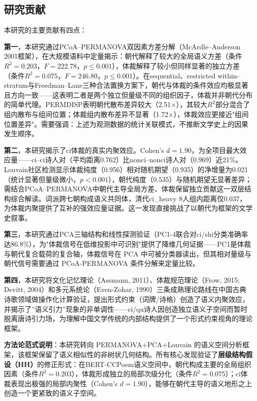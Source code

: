 \documentclass[12pt,a4paper]{article}
\numberwithin{equation}{section}
\begin{document}
\subsection{研究贡献}

本研究的主要贡献有四点：

\textbf{第一}，本研究通过PCoA--PERMANOVA双因素方差分解（McArdle--Anderson 2001框架），在大规模语料中定量揭示：朝代解释了较大的全局语义方差（条件$R^{2}=0.203$，$F=222.78$，$p\leq0.001$），体裁解释了较小但同样显著的独立方差（条件$R^{2}=0.075$，$F=246.80$，$p\leq0.001$）。在sequential、restricted within-stratum与Freedman--Lane三种合法置换方案下，朝代与体裁的条件效应均极显著且方向一致——这表明二者是两个独立但量级不同的组织因子，体裁并非朝代分布的简单代理。PERMDISP表明朝代散布差异较大（2.51$\times$），其较大$R^{2}$部分混合了组内散布与组间位置；体裁组内散布差异不显著（1.72$\times$），体裁效应更接近"组间位置差异"。需要强调：上述为观测数据的统计关联模式，不推断文学史上的因果发生顺序。

\textbf{第二}，本研究揭示了ci体裁的真实内聚效应。Cohen's $d=1.90$，为全项目最大效应量——ci--ci诗人对（平均距离0.762）比nonci--nonci诗人对（0.969）近21\%。Louvain社区检测显示体裁纯度（0.956）相对随机期望（0.935）的净增量为0.021（统计显著但量级微小，$p<0.001$），朝代纯度（0.535）与随机期望无显著差异；需结合PCoA--PERMANOVA中朝代主导全局方差、体裁保留独立贡献这一双层结构综合解读。词派跨七朝构成语义共同体，清代ci\_heavy 8人组内距离仅0.037，为体裁内聚提供了互补的强效应量证据。这一发现直接挑战了以朝代为框架的文学史叙事。

\textbf{第三}，本研究通过PCA三轴结构和线性探测验证（PC1-4联合对ci/shi分类准确率达86.8\%），为"体裁信号在低维投影中可识别"提供了降维几何证据——PC1是体裁与朝代复合载荷的复合轴，体裁信号在 PCA 中可被分类器读出，但其相对量级与朝代信号需要通过 PCoA-PERMANOVA 条件分解来定量比较。

\textbf{第四}，本研究将文化记忆理论（Assmann, 2011）、体裁规范理论（Frow, 2015; Devitt, 2004）和多元系统论（Even-Zohar, 1990）三条成熟理论路线在中国古典诗歌领域做操作化计算验证，提出形式约束（词牌/诗格）创造了语义内聚效应，并揭示了”语义引力”现象的非单调性——ci/qu诗人因创造独立语义子空间而暂时脱离唐诗引力场，为理解中国文学传统的内部结构提供了一个形式约束视角的理论框架。

\textbf{方法论范式说明}：本研究转向 PERMANOVA+PCA+Louvain 的语义空间分析框架，该框架保留了语义相似性的非树状几何结构。所有核心发现验证了\textbf{层级结构假设（HH）}的修正形式：在BERT-CCPoem语义空间中，朝代构成主要的全局组织因素（条件$R^{2}=0.203$），体裁形成独立的局部次级分化（条件$R^{2}=0.075$）；ci体裁表现出极强的局部内聚性（Cohen's $d=1.90$），能够在朝代主导的语义地形之上创造一个更紧致的语义子空间。
\end{document}
